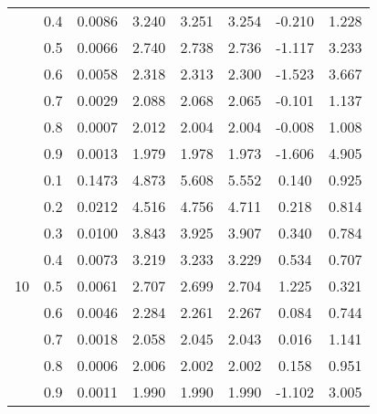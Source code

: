 \documentclass[11pt,a4paper]{report}
\begin{document}
\begin{longtable}{ | c | c || c | c | c | c | c | c | }
 & 0.4 & 0.0086 & 3.240 & 3.251 & 3.254 & -0.210 & 1.228 \\
 & 0.5 & 0.0066 & 2.740 & 2.738 & 2.736 & -1.117 & 3.233 \\
 & 0.6 & 0.0058 & 2.318 & 2.313 & 2.300 & -1.523 & 3.667 \\
 & 0.7 & 0.0029 & 2.088 & 2.068 & 2.065 & -0.101 & 1.137 \\
 & 0.8 & 0.0007 & 2.012 & 2.004 & 2.004 & -0.008 & 1.008 \\
 & 0.9 & 0.0013 & 1.979 & 1.978 & 1.973 & -1.606 & 4.905 \\
 \hline
\multirow{9}{*}{10} & 0.1 & 0.1473 & 4.873 & 5.608 & 5.552 & 0.140 & 0.925 \\
 & 0.2 & 0.0212 & 4.516 & 4.756 & 4.711 & 0.218 & 0.814 \\
 & 0.3 & 0.0100 & 3.843 & 3.925 & 3.907 & 0.340 & 0.784 \\
 & 0.4 & 0.0073 & 3.219 & 3.233 & 3.229 & 0.534 & 0.707 \\
 & 0.5 & 0.0061 & 2.707 & 2.699 & 2.704 & 1.225 & 0.321 \\
 & 0.6 & 0.0046 & 2.284 & 2.261 & 2.267 & 0.084 & 0.744 \\
 & 0.7 & 0.0018 & 2.058 & 2.045 & 2.043 & 0.016 & 1.141 \\
 & 0.8 & 0.0006 & 2.006 & 2.002 & 2.002 & 0.158 & 0.951 \\
 & 0.9 & 0.0011 & 1.990 & 1.990 & 1.990 & -1.102 & 3.005 \\
 \hline
\hline
\end{longtable}
\end{document}

